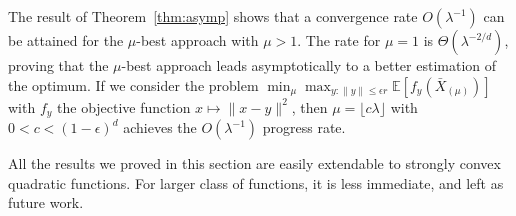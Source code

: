 The result of Theorem~\ref{thm:asymp} shows that a convergence rate $O(\lambda^{-1})$ can be attained for the $\mu$-best approach with $\mu>1$. The rate for $\mu=1$ is $\Theta(\lambda^{-2/d})$, proving that the $\mu$-best approach leads asymptotically to a better estimation of the optimum. 
If we consider the problem $\min_\mu\max_{y:\lVert y\rVert \leq \epsilon r}\mathbb{E}\left[f_y(\bar{X}_{(\mu)})\right]$ with $f_y$ the objective function $x\mapsto \lVert x-y\rVert ^2$, then $\mu=\lfloor c\lambda\rfloor$ with $0<c<(1-\epsilon)^{d}$ achieves the  $O\left(\lambda^{-1}\right)$ progress rate. 

All the results we proved in this section are easily extendable to strongly convex quadratic functions. For larger class of functions, it is  less immediate, and left as future work.
